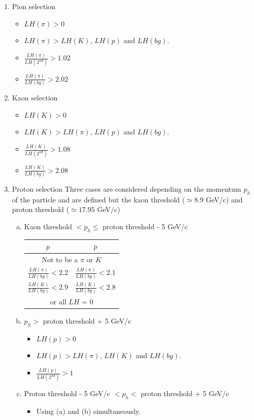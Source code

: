 \documentclass[letterpaper,12pt]{article}
\begin{document}
\begin{enumerate}
  \item Pion selection
  \begin{itemize}
    \item $LH(\pi) > 0$
    \item $LH(\pi) > LH(K)$, $LH(p)$ and $LH(bg)$.
    \item $\frac{LH(\pi)}{LH(2^{nd})}>1.02$
    \item $\frac{LH(\pi)}{LH(bg)}>2.02$
  \end{itemize}
  \item Kaon selection
  \begin{itemize}
    \item $LH(K) > 0$
    \item $LH(K) > LH(\pi)$, $LH(p)$ and $LH(bg)$.
    \item $\frac{LH(K)}{LH(2^{nd})}>1.08$
    \item $\frac{LH(K)}{LH(bg)}>2.08$
  \end{itemize}
  \item Proton selection
  Three cases are considered depending on the momentum $p_{h}$ of the particle and are defined but the kaon threshold ($\simeq 8.9$ GeV/c)
  and proton threshold ($\simeq 17.95$ GeV/c)
  \begin{enumerate}[(a)]
    \item Kaon threshold $< p_{h} \leq$ proton threshold - 5 GeV/c
	  \begin{center}
		  \begin{tabular}{c|c}
		    \hline
		     $p$ & $\bar{p}$ \\
		    \hline
				\multicolumn{2}{c}{Not to be a $\pi$ or $K$} \\
		    $\frac{LH(\pi)}{LH(bg)} < 2.2$ & $\frac{LH(\pi)}{LH(bg)} < 2.1$ \\
		    $\frac{LH(K)}{LH(bg)} < 2.9$ & $\frac{LH(K)}{LH(bg)} < 2.8$ \\
		    \hline
				\multicolumn{2}{c}{or all $LH$ = 0} \\
				\hline
		  \end{tabular}
		\end{center}
    \item $p_{h} >$ proton threshold + 5 GeV/c
    \begin{itemize}
      \item $LH(p) > 0$
      \item $LH(p) > LH(\pi)$, $LH(K)$ and $LH(bg)$.
      \item $\frac{LH(p)}{LH(2^{nd})}>1$
    \end{itemize}
    \item Proton threshold - 5 GeV/c $< p_{h} <$ proton threshold + 5 GeV/c
    \begin{itemize}
      \item Using (a) and (b) simultaneously.
    \end{itemize}
  \end{enumerate}
\end{enumerate}
\end{document}
